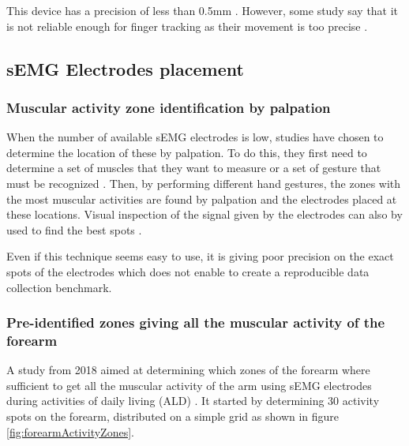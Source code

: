 \documentclass{article}
\begin{document}
This device has a precision of less than 0.5mm \cite{ref:Ngeo2014}. However, some study say that it is not reliable enough for finger tracking as their movement is too precise \cite{ref:KinMusUji}.




\subsection{sEMG Electrodes placement}

\subsubsection{Muscular activity zone identification by palpation}

When the number of available sEMG electrodes is low, studies have chosen to determine the location of these by palpation. To do this, they first need to determine a set of muscles that they want to measure \cite{ref:Hioki2012} or a set of gesture that must be recognized \cite{ref:Ngeo2014, ref:comp6EMGsetup}. Then, by performing different hand gestures, the zones with the most muscular activities are found by palpation and the electrodes placed at these locations. Visual inspection of the signal given by the electrodes can also by used to find the best spots \cite{ref:Ngeo2014}.

Even if this technique seems easy to use, it is giving poor precision on the exact spots of the electrodes which does not enable to create a reproducible data collection benchmark.


\subsubsection{Pre-identified zones giving all the muscular activity of the forearm}

A study from 2018 \cite{ref:identifiedEMGlocation} aimed at determining which zones of the forearm where sufficient to get all the muscular activity of the arm using sEMG electrodes during activities of daily living (ALD) \cite{ref:ADL1}. It started by determining 30 activity spots on the forearm, distributed on a simple grid as shown in figure \ref{fig:forearmActivityZones}.
\end{document}
